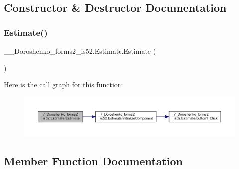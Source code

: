 \subsection{Constructor \& Destructor Documentation}
\hypertarget{class__7___doroshenko__forms2__is52_1_1_estimate_a8b51b4a73ab5d29d09494603f1493739}{}\label{class__7___doroshenko__forms2__is52_1_1_estimate_a8b51b4a73ab5d29d09494603f1493739} 
\subsubsection{\texorpdfstring{Estimate()}{Estimate()}}
{\footnotesize\ttfamily \+\_\+\_\+\+Doroshenko\+\_\+forms2\+\_\+is52.\+Estimate.\+Estimate (\begin{DoxyParamCaption}{ }\end{DoxyParamCaption})}

Here is the call graph for this function\+:
\nopagebreak
\begin{figure}[H]
\begin{center}
\leavevmode
\includegraphics[width=350pt]{class__7___doroshenko__forms2__is52_1_1_estimate_a8b51b4a73ab5d29d09494603f1493739_cgraph}
\end{center}
\end{figure}


\subsection{Member Function Documentation}
\hypertarget{class__7___doroshenko__forms2__is52_1_1_estimate_a34445933242ab461b53690eaa9f294df}{}\label{class__7___doroshenko__forms2__is52_1_1_estimate_a34445933242ab461b53690eaa9f294df} 
